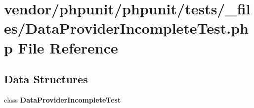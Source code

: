 \section{vendor/phpunit/phpunit/tests/\+\_\+files/\+Data\+Provider\+Incomplete\+Test.php File Reference}
\label{_data_provider_incomplete_test_8php}
\subsection*{Data Structures}
\begin{DoxyCompactItemize}
\item 
class {\bf Data\+Provider\+Incomplete\+Test}
\end{DoxyCompactItemize}
